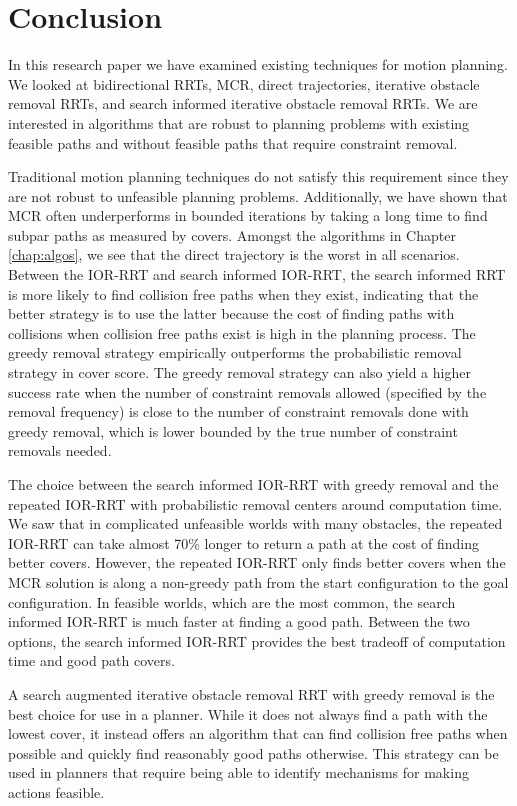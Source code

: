 \chapter{Conclusion}
In this research paper we have examined existing techniques for motion planning. We looked at bidirectional RRTs, MCR, direct trajectories, iterative obstacle removal RRTs, and search informed iterative obstacle removal RRTs. We are interested in algorithms that are robust to planning problems with existing feasible paths and without feasible paths that require constraint removal.

Traditional motion planning techniques do not satisfy this requirement since they are not robust to unfeasible planning problems. Additionally, we have shown that MCR often underperforms in bounded iterations by taking a long time to find subpar paths as measured by covers. Amongst the algorithms in Chapter \ref{chap:algos}, we see that the direct trajectory is the worst in all scenarios. Between the IOR-RRT and search informed IOR-RRT, the search informed RRT is more likely to find collision free paths when they exist, indicating that the better strategy is to use the latter because the cost of finding paths with collisions when collision free paths exist is high in the planning process. The greedy removal strategy empirically outperforms the probabilistic removal strategy in cover score. The greedy removal strategy can also yield a higher success rate when the number of constraint removals allowed (specified by the removal frequency) is close to the number of constraint removals done with greedy removal, which is lower bounded by the true number of constraint removals needed.

The choice between the search informed IOR-RRT with greedy removal and the repeated IOR-RRT with probabilistic removal centers around computation time. We saw that in complicated unfeasible worlds with many obstacles, the repeated IOR-RRT can take almost 70\% longer to return a path at the cost of finding better covers. However, the repeated IOR-RRT only finds better covers when the MCR solution is along a non-greedy path from the start configuration to the goal configuration. In feasible worlds, which are the most common, the search informed IOR-RRT is much faster at finding a good path. Between the two options, the search informed IOR-RRT provides the best tradeoff of computation time and good path covers.

A search augmented iterative obstacle removal RRT with greedy removal is the best choice for use in a planner. While it does not always find a path with the lowest cover, it instead offers an algorithm that can find collision free paths when possible and quickly find reasonably good paths otherwise. This strategy can be used in planners that require being able to identify mechanisms for making actions feasible.
